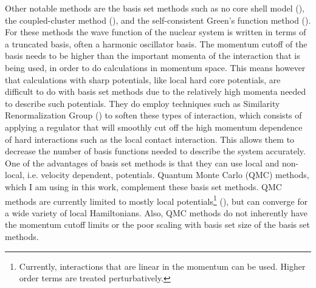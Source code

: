 Other notable methods are the basis set methods such as no core shell model (\cite{navratil2009,barrett2013}), the coupled-cluster method (\cite{hagen2014}), and the self-consistent Green's function method (\cite{dickhoff2004,soma2014}). For these methods the wave function of the nuclear system is written in terms of a truncated basis, often a harmonic oscillator basis. The momentum cutoff of the basis needs to be higher than the important momenta of the interaction that is being used, in order to do calculations in momentum space. This means however that calculations with sharp potentials, like local hard core potentials, are difficult to do with basis set methods due to the relatively high momenta needed to describe such potentials. They do employ techniques such as Similarity Renormalization Group (\cite{hergert2016}) to soften these types of interaction, which consists of applying a regulator that will smoothly cut off the high momentum dependence of hard interactions such as the local contact interaction. This allows them to decrease the number of basis functions needed to describe the system accurately. One of the advantages of basis set methods is that they can use local and non-local, i.e. velocity dependent, potentials. Quantum Monte Carlo (QMC) methods, which I am using in this work, complement these basis set methods. QMC methods are currently limited to mostly local potentials\footnote{Currently, interactions that are linear in the momentum can be used. Higher order terms are treated perturbatively.} (\cite{lynn2012}), but can converge for a wide variety of local Hamiltonians. Also, QMC methods do not inherently have the momentum cutoff limits or the poor scaling with basis set size of the basis set methods.

